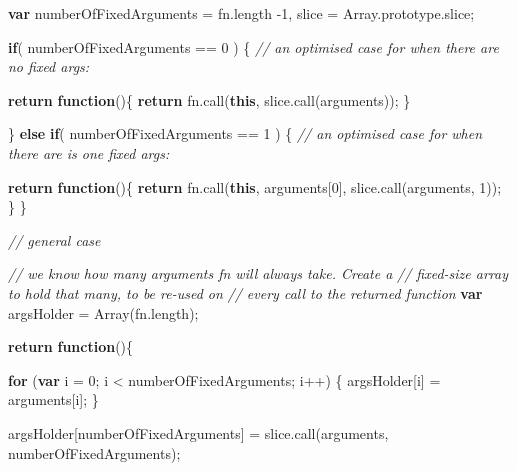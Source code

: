 \documentclass[12pt, ]{article}
\newenvironment{Shaded}{}{}
\newcommand{\KeywordTok}[1]{\textcolor[rgb]{0.00,0.44,0.13}{\textbf{{#1}}}}
\newcommand{\DecValTok}[1]{\textcolor[rgb]{0.25,0.63,0.44}{{#1}}}
\newcommand{\CommentTok}[1]{\textcolor[rgb]{0.38,0.63,0.69}{\textit{{#1}}}}
\newcommand{\OtherTok}[1]{\textcolor[rgb]{0.00,0.44,0.13}{{#1}}}
\newcommand{\FunctionTok}[1]{\textcolor[rgb]{0.02,0.16,0.49}{{#1}}}
\newcommand{\NormalTok}[1]{{#1}}
\begin{document}
\begin{Shaded}
\begin{Highlighting}[]
   \KeywordTok{var} \NormalTok{numberOfFixedArguments = }\OtherTok{fn}\NormalTok{.}\FunctionTok{length} \NormalTok{-}\DecValTok{1}\NormalTok{,}
       \NormalTok{slice = }\OtherTok{Array}\NormalTok{.}\OtherTok{prototype}\NormalTok{.}\FunctionTok{slice}\NormalTok{;          }
         
                   
   \KeywordTok{if}\NormalTok{( numberOfFixedArguments == }\DecValTok{0} \NormalTok{) \{}
      \CommentTok{// an optimised case for when there are no fixed args:   }
   
      \KeywordTok{return} \KeywordTok{function}\NormalTok{()\{}
         \KeywordTok{return} \OtherTok{fn}\NormalTok{.}\FunctionTok{call}\NormalTok{(}\KeywordTok{this}\NormalTok{, }\OtherTok{slice}\NormalTok{.}\FunctionTok{call}\NormalTok{(arguments));}
      \NormalTok{\}}
      
   \NormalTok{\} }\KeywordTok{else} \KeywordTok{if}\NormalTok{( numberOfFixedArguments == }\DecValTok{1} \NormalTok{) \{}
      \CommentTok{// an optimised case for when there are is one fixed args:}
   
      \KeywordTok{return} \KeywordTok{function}\NormalTok{()\{}
         \KeywordTok{return} \OtherTok{fn}\NormalTok{.}\FunctionTok{call}\NormalTok{(}\KeywordTok{this}\NormalTok{, arguments[}\DecValTok{0}\NormalTok{], }\OtherTok{slice}\NormalTok{.}\FunctionTok{call}\NormalTok{(arguments, }\DecValTok{1}\NormalTok{));}
      \NormalTok{\}}
   \NormalTok{\}}
   
   \CommentTok{// general case   }

   \CommentTok{// we know how many arguments fn will always take. Create a}
   \CommentTok{// fixed-size array to hold that many, to be re-used on}
   \CommentTok{// every call to the returned function}
   \KeywordTok{var} \NormalTok{argsHolder = }\FunctionTok{Array}\NormalTok{(}\OtherTok{fn}\NormalTok{.}\FunctionTok{length}\NormalTok{);   }
                             
   \KeywordTok{return} \KeywordTok{function}\NormalTok{()\{}
                            
      \KeywordTok{for} \NormalTok{(}\KeywordTok{var} \NormalTok{i = }\DecValTok{0}\NormalTok{; i < numberOfFixedArguments; i++) \{}
         \NormalTok{argsHolder[i] = arguments[i];         }
      \NormalTok{\}}

      \NormalTok{argsHolder[numberOfFixedArguments] = }
         \OtherTok{slice}\NormalTok{.}\FunctionTok{call}\NormalTok{(arguments, numberOfFixedArguments);}
                                

\end{Highlighting}
\end{Shaded}
\end{document}
